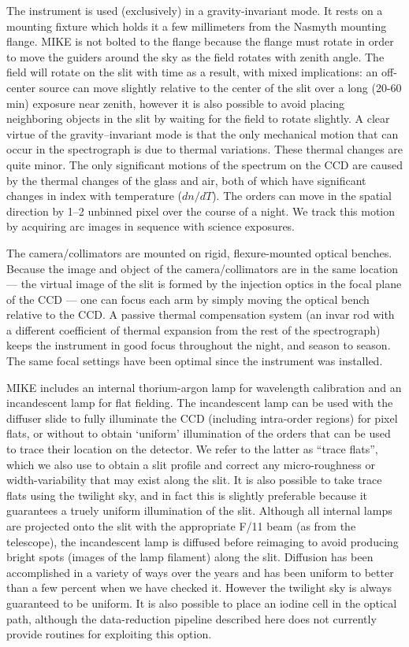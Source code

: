 \documentclass[]{emulateapj}
\begin{document}
The instrument is used (exclusively) in a gravity-invariant mode.  It
rests on a mounting fixture which holds it a few millimeters from the
Nasmyth mounting flange.  MIKE is not bolted to the flange because the
flange must rotate in order to move the guiders around the sky as the
field rotates with zenith angle. The field will rotate on the slit
with time as a result, with mixed implications: an off-center source
can move slightly relative to the center of the slit over a long
(20-60 min) exposure near zenith, however it is also possible to avoid
placing neighboring objects in the slit by waiting for the field to
rotate slightly.  A clear virtue of the gravity--invariant mode is
that the only mechanical motion that can occur in the spectrograph is
due to thermal variations. These thermal changes are quite minor.
The only significant motions of the spectrum on the CCD are caused by
the thermal changes of the glass and air, both of which have
significant changes in index with temperature ($dn/dT$).  The orders can
move in the spatial direction by 1--2 unbinned pixel over the course
of a night.  We track this motion by acquiring arc images in
sequence with science exposures.

The camera/collimators are mounted on rigid, flexure-mounted optical
benches.  Because the image and object of the camera/collimators are
in the same location --- the virtual image of the slit is formed by
the injection optics in the focal plane of the CCD --- one can focus
each arm by simply moving the optical bench relative to the CCD.  A
passive thermal compensation system (an invar rod with a different
coefficient of thermal expansion from the rest of the spectrograph)
keeps the instrument in good focus throughout the night, and season to
season. The same focal settings have been optimal since the
instrument was installed.

MIKE includes an internal thorium-argon lamp for wavelength
calibration and an incandescent lamp for flat fielding.  The
incandescent lamp can be used with the diffuser slide to fully
illuminate the CCD (including intra-order regions) for pixel flats, or
without to obtain `uniform' illumination of the orders that can be
used to trace their location on the detector.  We refer to the latter
as ``trace flats'', which we also use to obtain a slit profile and correct
any micro-roughness or width-variability that may exist along the
slit.  It is also possible to take trace flats using the twilight sky,
and in fact this is slightly preferable because it guarantees a truely
uniform illumination of the slit.  Although all internal lamps are
projected onto the slit with the appropriate F/11 beam (as from the
telescope), the incandescent lamp is diffused before reimaging to
avoid producing bright spots (images of the lamp filament) along the
slit.  Diffusion has been accomplished in a variety of ways over the
years and has been uniform to better than a few percent when we have
checked it.  However the twilight sky is always guaranteed to be
uniform.
It is also possible to place an iodine cell in the optical path, although
the data-reduction pipeline described here does not currently
provide routines for exploiting this option.
\end{document}
